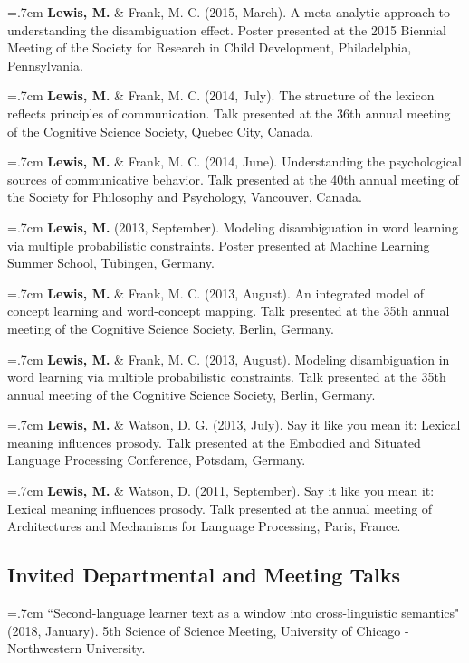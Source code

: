 \documentclass[letterpaper]{article}
\begin{document}
\hangindent=.7cm {\bf Lewis, M.} \& Frank, M. C. (2015, March). A meta-analytic approach to understanding the disambiguation effect. Poster presented at  the 2015 Biennial Meeting of the Society for Research in Child Development, Philadelphia, Pennsylvania.


\hangindent=.7cm {\bf Lewis, M.} \& Frank, M. C. (2014, July). The structure of the lexicon reflects  principles of communication. Talk presented at the 36th annual meeting of the Cognitive Science Society, Quebec City, Canada.

\hangindent=.7cm {\bf Lewis, M.} \& Frank, M. C. (2014, June). Understanding the psychological sources of communicative behavior. Talk presented at the 40th annual meeting of the Society for Philosophy and Psychology, Vancouver, Canada.

 \hangindent=.7cm {\bf Lewis, M.} (2013, September). Modeling disambiguation in word learning via multiple probabilistic constraints. Poster presented at Machine Learning Summer School, T\"{u}bingen, Germany.
 

 \hangindent=.7cm {\bf Lewis, M.}  \& Frank, M. C. (2013, August). An integrated model of concept learning and word-concept mapping. Talk presented at the 35th annual meeting of the Cognitive Science Society, Berlin, Germany.
 
 \hangindent=.7cm {\bf Lewis, M.}  \& Frank, M. C.  (2013, August). Modeling disambiguation in word learning via multiple probabilistic constraints. Talk presented at the 35th annual meeting of the Cognitive Science Society, Berlin, Germany.
 
  \hangindent=.7cm {\bf Lewis, M.} \& Watson, D. G.  (2013, July). Say it like you mean it: Lexical meaning influences prosody. Talk presented at the Embodied and Situated Language Processing Conference, Potsdam, Germany.
 

 \hangindent=.7cm {\bf Lewis, M.}  \& Watson, D. (2011, September). Say it like you mean it: Lexical meaning influences prosody. Talk presented at the annual meeting of Architectures and Mechanisms for Language Processing, Paris, France.
 

\subsection*{Invited Departmental and Meeting Talks}

\hangindent=.7cm ``Second-language learner text as a window into cross-linguistic semantics" (2018, January). 5th Science of Science Meeting,  University of Chicago - Northwestern University.
\end{document}
